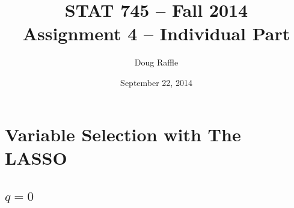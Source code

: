 \documentclass[a4paper]{article}
\title{\vspace{-30pt}STAT 745 -- Fall 2014\\Assignment 4 -- Individual Part}
\author{Doug Raffle}
\date{September 22, 2014}
\begin{document}
\setlength{\parindent}{0pt}
\vspace{-50pt}
\maketitle

\section{Variable Selection with The LASSO}
\vspace{-30pt}
\begin{minipage}[t]{0.45\linewidth}
\end{minipage}

\subsection{$q=0$}
\vspace{-20pt}
\end{document}
